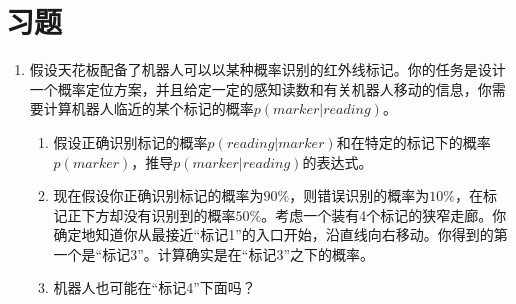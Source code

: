 \section*{习题}\small
\begin{enumerate}

\item 假设天花板配备了机器人可以以某种概率识别的红外线标记。你的任务是设计一个概率定位方案，并且给定一定的感知读数和有关机器人移动的信息，你需要计算机器人临近的某个标记的概率$p(marker|reading)$。
\begin{enumerate}

\item 假设正确识别标记的概率$p(reading|marker)$和在特定的标记下的概率$p(marker)$，推导$p(marker|reading)$的表达式。
\item 现在假设你正确识别标记的概率为$90\%$，则错误识别的概率为$10\%$，在标记正下方却没有识别到的概率$50\%$。考虑一个装有4个标记的狭窄走廊。你确定地知道你从最接近“标记1”的入口开始，沿直线向右移动。你得到的第一个是“标记3”。计算确实是在“标记3”之下的概率。
\item 机器人也可能在“标记4”下面吗？
\end{enumerate}
\end{enumerate}\normalsize